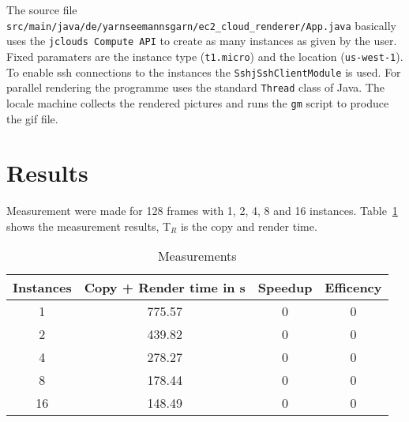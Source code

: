 \documentclass{article}
\begin{document}
The source file \texttt{src/\-main/\-java/\-de/\-yarnseemannsgarn/\-ec2\_cloud\_renderer/\-App.java} basically uses the \texttt{jclouds Compute API} to create as many instances as given by the user. Fixed paramaters are the instance type (\texttt{t1.micro}) and the location (\texttt{us-west-1}). To enable ssh connections to the instances the \texttt{Sshj\-Ssh\-Client\-Module} is used. For parallel rendering the programme uses the standard \texttt{Thread} class of Java. The locale machine collects the rendered pictures and runs the \texttt{gm} script to produce the gif file.


\section{Results}

Measurement were made for 128 frames with 1, 2, 4, 8 and 16 instances. Table~\ref{tab:measurements} shows the measurement results, T$_R$ is the copy and render time.

\begin{table}[htbp]
\centering
\begin{tabular}{ | c | c | c | c | }
\hline
\textbf{Instances} & \textbf{Copy + Render time} in s & \textbf{Speedup} & \textbf{Efficency} \\
\hline \hline
1 & 775.57 & 0 & 0 \\
\hline
2 & 439.82 & 0 & 0 \\
\hline
4 & 278.27 & 0 & 0 \\
\hline
8 & 178.44 & 0 & 0 \\
\hline
16 & 148.49 & 0 & 0 \\
\hline
\end{tabular}
\caption{Measurements}
\label{tab:measurements}
\end{table}


\end{document}
